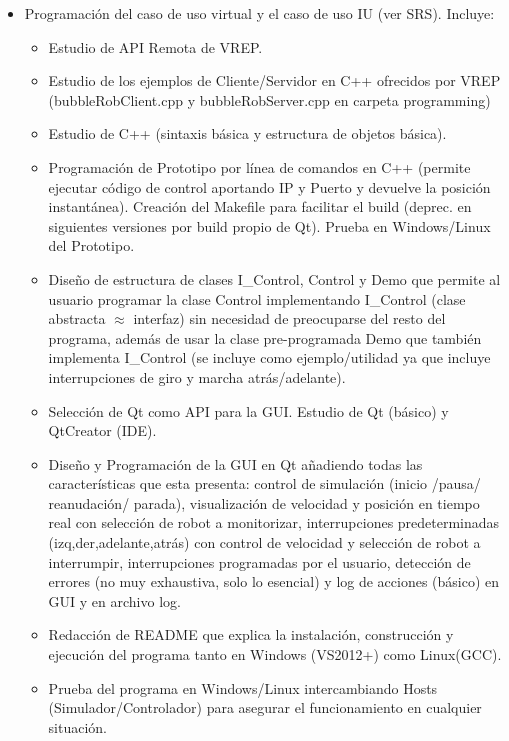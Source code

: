 \documentclass{article}
\begin{document}
\begin{itemize}
  \item Programación del caso de uso virtual y el caso de uso IU (ver SRS).
  Incluye:
	  \begin{itemize}
	    \item Estudio de API Remota de VREP.
	  	\item Estudio de los ejemplos de Cliente/Servidor en C++ ofrecidos por VREP
	  	(bubbleRobClient.cpp y bubbleRobServer.cpp en carpeta programming)
	  	\item Estudio de C++ (sintaxis básica y estructura de objetos básica).
	  	\item Programación de Prototipo por línea de comandos en C++ (permite
	  	ejecutar código de control aportando IP y Puerto y devuelve la posición
	  	instantánea). Creación del Makefile para facilitar el build (deprec. en
	  	siguientes versiones por build propio de Qt). Prueba en Windows/Linux del
	  	Prototipo.
	  	\item Diseño de estructura de clases I\_Control, Control y Demo que permite
	  	al usuario programar la clase Control implementando I\_Control (clase
	  	abstracta $ \approx $ interfaz) sin necesidad de preocuparse del resto del
	  	programa,  además de usar la clase pre-programada Demo que también
	  	implementa I\_Control (se incluye como ejemplo/utilidad ya que incluye interrupciones de giro y marcha atrás/adelante).
	  	\item Selección de Qt como API para la GUI. Estudio de Qt
	  	(básico) y QtCreator (IDE).
	  	\item Diseño y Programación de la GUI en Qt añadiendo todas las
	  	características que esta presenta: control de simulación (inicio
	  	/pausa/ reanudación/ parada), visualización de velocidad y posición en
	  	tiempo real con selección de robot a monitorizar, interrupciones
	  	predeterminadas (izq,der,adelante,atrás) con control de velocidad y selección de robot a interrumpir, interrupciones
	  	programadas por el usuario, detección de errores (no muy exhaustiva, solo lo
	  	esencial) y log de acciones (básico) en GUI y en archivo log.
	  	\item Redacción de README que explica la instalación, construcción y
	  	ejecución del programa tanto en Windows (VS2012+) como Linux(GCC).
	  	\item Prueba del programa en Windows/Linux intercambiando Hosts
	  	(Simulador/Controlador) para asegurar el funcionamiento en cualquier
	  	situación.
	  \end{itemize}

\end{itemize}
\end{document}
